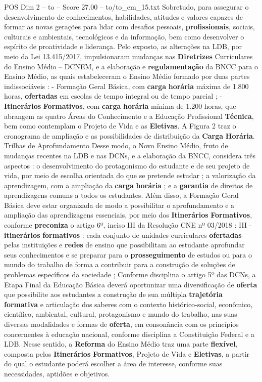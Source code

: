 \begin{textsample}{POS Dim 2 – to – Score 27.00 – to/to\_em\_15.txt}
Sobretudo, para assegurar o desenvolvimento de conhecimentos, habilidades, atitudes e valores capazes de formar as novas gerações para lidar com desafios pessoais, \textbf{profissionais}, sociais, culturais e ambientais, tecnológicos e da informação, bem como desenvolver o espírito de proatividade e liderança.
Pelo exposto, as alterações na LDB, por meio da Lei 13.415/2017, impulsionaram mudanças nas \textbf{Diretrizes} Curriculares do Ensino Médio – DCNEM, e a elaboração e \textbf{regulamentação} da BNCC para o Ensino Médio, as quais estabeleceram o Ensino Médio formado por duas partes indissociáveis : - Formação Geral Básica, com \textbf{carga} \textbf{horária} máxima de 1.800 horas, \textbf{ofertadas} em escolas de tempo integral ou de tempo parcial ; - \textbf{Itinerários} \textbf{Formativos}, com \textbf{carga} \textbf{horária} mínima de 1.200 horas, que abrangem as quatro Áreas do Conhecimento e a Educação Profissional \textbf{Técnica}, bem como contemplam o Projeto de Vida e as \textbf{Eletivas}.
A Figura 2 traz o cronograma de ampliação e as possibilidades de distribuição da \textbf{Carga} \textbf{Horária}.
Trilhas de Aprofundamento Desse modo, o Novo Ensino Médio, fruto de mudanças recentes na LDB e nas DCNs, e a elaboração da BNCC, considera três aspectos : o desenvolvimento do protagonismo do estudante e de seu projeto de vida, por meio de escolha orientada do que se pretende estudar ; a valorização da aprendizagem, com a ampliação da \textbf{carga} \textbf{horária} ; e a \textbf{garantia} de direitos de aprendizagens comuns a todos os estudantes.
Além disso, a Formação Geral Básica deve estar organizada de modo a possibilitar o aprofundamento e a ampliação das aprendizagens essenciais, por meio dos \textbf{Itinerários} \textbf{Formativos}, conforme \textbf{preconiza} o artigo 6º, inciso III da Resolução CNE nº 03/2018 : III - \textbf{itinerários} \textbf{formativos} : cada conjunto de unidades curriculares \textbf{ofertadas} pelas instituições e \textbf{redes} de ensino que possibilitam ao estudante aprofundar seus conhecimentos e se preparar para o \textbf{prosseguimento} de estudos ou para o mundo do trabalho de forma a contribuir para a construção de soluções de problemas específicos da sociedade ; Conforme disciplina o artigo 5º das DCNs, a Etapa Final da Educação Básica deverá oportunizar uma diversificação de \textbf{oferta} que possibilite aos estudantes a construção de sua múltipla \textbf{trajetória} \textbf{formativa} e articulação dos saberes com o contexto histórico-social, econômico, científico, ambiental, cultural, protagonismo e mundo do trabalho, nas suas diversas modalidades e formas de \textbf{oferta}, em consonância com os princípios concernentes à educação nacional, conforme disciplina a Constituição Federal e a LDB.
Nesse sentido, a \textbf{Reforma} do Ensino Médio traz uma parte \textbf{flexível}, composta pelos \textbf{Itinerários} \textbf{Formativos}, Projeto de Vida e \textbf{Eletivas}, a partir do qual o estudante poderá escolher a área de interesse, conforme suas necessidades, aptidões e objetivos.


\end{textsample}
